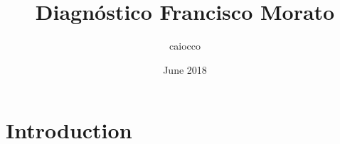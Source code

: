 \documentclass{article}
\title{Diagnóstico Francisco Morato}
\author{caiocco }
\date{June 2018}
\begin{document}
\maketitle

\section{Introduction}
\end{document}
